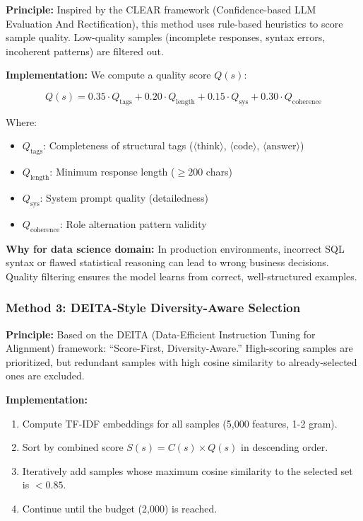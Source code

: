 \documentclass[12pt,a4paper]{article}
\begin{document}
\textbf{Principle:} Inspired by the CLEAR framework (Confidence-based LLM Evaluation And Rectification), this method uses rule-based heuristics to score sample quality. Low-quality samples (incomplete responses, syntax errors, incoherent patterns) are filtered out.

\textbf{Implementation:} We compute a quality score $Q(s)$:

\begin{equation}
Q(s) = 0.35 \cdot Q_{\text{tags}} + 0.20 \cdot Q_{\text{length}} + 0.15 \cdot Q_{\text{sys}} + 0.30 \cdot Q_{\text{coherence}}
\end{equation}

Where:
\begin{itemize}[leftmargin=*]
    \item $Q_{\text{tags}}$: Completeness of structural tags ($\langle\text{think}\rangle$, $\langle\text{code}\rangle$, $\langle\text{answer}\rangle$)
    \item $Q_{\text{length}}$: Minimum response length ($\geq 200$ chars)
    \item $Q_{\text{sys}}$: System prompt quality (detailedness)
    \item $Q_{\text{coherence}}$: Role alternation pattern validity
\end{itemize}

\textbf{Why for data science domain:} In production environments, incorrect SQL syntax or flawed statistical reasoning can lead to wrong business decisions. Quality filtering ensures the model learns from correct, well-structured examples.

\subsubsection{Method 3: DEITA-Style Diversity-Aware Selection}

\textbf{Principle:} Based on the DEITA (Data-Efficient Instruction Tuning for Alignment) framework: ``Score-First, Diversity-Aware.'' High-scoring samples are prioritized, but redundant samples with high cosine similarity to already-selected ones are excluded.

\textbf{Implementation:}
\begin{enumerate}[leftmargin=*]
    \item Compute TF-IDF embeddings for all samples (5,000 features, 1-2 gram).
    \item Sort by combined score $S(s) = C(s) \times Q(s)$ in descending order.
    \item Iteratively add samples whose maximum cosine similarity to the selected set is $< 0.85$.
    \item Continue until the budget (2,000) is reached.
\end{enumerate}
\end{document}
